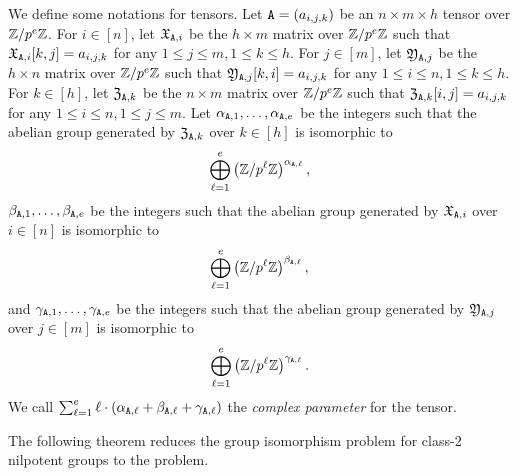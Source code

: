 We define some notations for tensors. 
Let $\mathtt{A} = (a_{i, j, k})$ be an $n \times m \times h$ tensor over $\mathbb{Z} / p^{e} \mathbb{Z}$. For $i\in[n]$, let $\mathfrak{X}_{\mathtt{A}, i}$ be the $h \times m$ matrix over $\mathbb{Z} / p^{e} \mathbb{Z}$ such that $\mathfrak{X}_{\mathtt{A}, i}[k, j] = a_{i, j, k}$ for any $1 \leq j \leq m, 1 \leq k \leq h$. For $j\in[m]$, let 
$\mathfrak{Y}_{\mathtt{A}, j}$ be the $h \times n$ matrix over $\mathbb{Z} / p^{e} \mathbb{Z}$ such that $\mathfrak{Y}_{\mathtt{A}, j}[k, i] = a_{i, j, k}$ for any $1 \leq i \leq n, 1 \leq k \leq h$. For $k\in[h]$, let $\mathfrak{Z}_{\mathtt{A}, k}$ be the $n \times m$ matrix over $\mathbb{Z} / p^{e} \mathbb{Z}$ such that $\mathfrak{Z}_{\mathtt{A}, k}[i, j] = a_{i, j, k}$ for any $1 \leq i \leq n, 1 \leq j \leq m$.
Let $\alpha_{\mathtt{A}, 1}, \dots, \alpha_{\mathtt{A}, e}$ be the integers such that the abelian group generated by $\mathfrak{Z}_{\mathtt{A}, k}$ over $k\in[h]$ is isomorphic to 
\[\bigoplus_{\ell = 1}^{e} \left(\mathbb{Z} / p^{\ell } \mathbb{Z}\right)^{\alpha_{\mathtt{A}, \ell}},\]
$\beta_{\mathtt{A}, 1}, \dots, \beta_{\mathtt{A}, e}$ be the integers such that the abelian group generated by $\mathfrak{X}_{\mathtt{A}, i}$ over $i\in[n]$ is isomorphic to 
\[\bigoplus_{\ell = 1}^{e} \left(\mathbb{Z} / p^{\ell } \mathbb{Z}\right)^{\beta_{\mathtt{A}, \ell}},\]
and 
$\gamma_{\mathtt{A}, 1}, \dots, \gamma_{\mathtt{A}, e}$ be the integers such that the abelian group generated by $\mathfrak{Y}_{\mathtt{A}, j}$ over $j\in[m]$ is isomorphic to 
\[\bigoplus_{\ell = 1}^{e} \left(\mathbb{Z} / p^{\ell } \mathbb{Z}\right)^{\gamma_{\mathtt{A}, \ell}}.\]
We call $\sum_{\ell = 1}^e \ell \cdot (\alpha_{\mathtt{A}, \ell} + \beta_{\mathtt{A}, \ell} + \gamma_{\mathtt{A}, \ell})$ the \emph{complex parameter} for the tensor. 




The following theorem reduces the group isomorphism problem for class-2 nilpotent groups to the  problem. 

%
%

